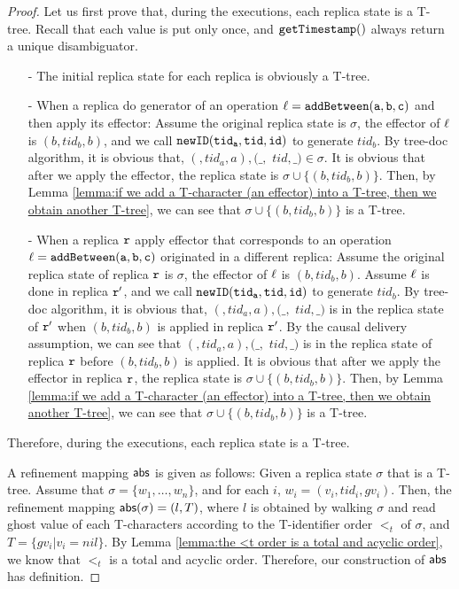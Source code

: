 \begin {proof}

Let us first prove that, during the executions, each replica state is a T-tree. Recall that each value is put only once, and $\alabelshort[{\tt getTimestamp}]{}$ always return a unique disambiguator.

\begin{itemize}
\setlength{\itemsep}{0.5pt}
\item[-] The initial replica state for each replica is obviously a T-tree.

\item[-] When a replica do generator of an operation $\alabel = \alabelshort[{\tt addBetween}]{a,b,c}$ and then apply its effector: Assume the original replica state is $\sigma$, the effector of $\alabel$ is $(b,tid_b,b)$, and we call $\alabelshort[{\tt newID}]{tid_a,tid,id}$ to generate $tid_b$. By tree-doc algorithm, it is obvious that, $(,tid_a,a),(\_,$ $tid,\_) \in \sigma$. It is obvious that after we apply the effector, the replica state is $\sigma \cup \{ (b,tid_b,b) \}$. Then, by Lemma \ref{lemma:if we add a T-character (an effector) into a T-tree, then we obtain another T-tree}, we can see that $\sigma \cup \{ (b,tid_b,b) \}$ is a T-tree.

\item[-] When a replica $\arep$ apply effector that corresponds to an operation $\alabel = \alabelshort[{\tt addBetween}]{a,b,c}$ originated in a different replica: Assume the original replica state of replica $\arep$ is $\sigma$, the effector of $\alabel$ is $(b,tid_b,b)$. Assume $\alabel$ is done in replica $\arep'$, and we call $\alabelshort[{\tt newID}]{tid_a,tid,id}$ to generate $tid_b$. By tree-doc algorithm, it is obvious that, $(,tid_a,a),(\_,$ $tid,\_)$ is in the replica state of $\arep'$ when $(b,tid_b,b)$ is applied in replica $\arep'$. By the causal delivery assumption, we can see that $(,tid_a,a),(\_,$ $tid,\_)$ is in the replica state of replica $\arep$ before $(b,tid_b,b)$ is applied. It is obvious that after we apply the effector in replica $\arep$, the replica state is $\sigma \cup \{ (b,tid_b,b) \}$. Then, by Lemma \ref{lemma:if we add a T-character (an effector) into a T-tree, then we obtain another T-tree}, we can see that $\sigma \cup \{ (b,tid_b,b) \}$ is a T-tree.
\end{itemize}

Therefore, during the executions, each replica state is a T-tree.

A refinement mapping $\refmap$ is given as follows: Given a replica state $\sigma$ that is a T-tree. Assume that $\sigma = \{ w_1,\ldots,w_n\}$, and for each $i$, $w_i = (v_i,tid_i,gv_i)$. Then, the refinement mapping $\refmap(\sigma) = (l,T)$, where $l$ is obtained by walking $\sigma$ and read ghost value of each T-characters according to the T-identifier order $<_t$ of $\sigma$, and $T = \{ gv_i \vert v_i = nil \}$. By Lemma \ref{lemma:the <t order is a total and acyclic order}, we know that $<_t$ is a total and acyclic order. Therefore, our construction of $\refmap$ has definition.


\end{proof}

